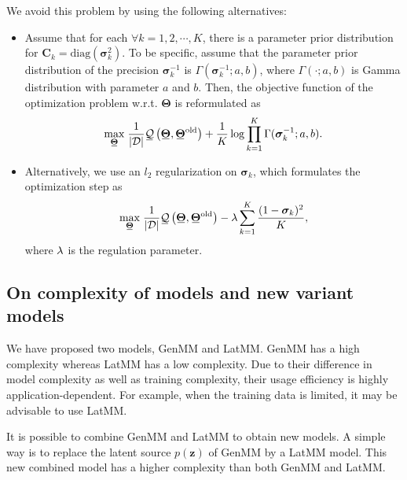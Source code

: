We avoid this problem by using the following alternatives:
\begin{itemize}
\item Assume that for each $\forall k=1, 2, \cdots, K$, there is a parameter prior distribution for $\bm{C}_k=\mathrm{diag}(\bm{\sigma}_k^2)$.
  To be specific, assume that the parameter prior distribution of the precision $\bm{\sigma}_k^{-1}$ is
  $\Gamma(\bm{\sigma}_k^{-1};a, b)$, where $\Gamma(\cdot; a, b)$ is
  Gamma distribution with parameter $a$ and $b$. Then, the objective function of the optimization problem w.r.t. $\bm{\Theta}$ is reformulated as
  \begin{equation}\label{eq-latmm-obj1}
    \umax{ \ubar{\bm{\Theta}}}   \frac{1}{\abs{\Dd}}
    \ubar{\Qq}\left(\ubar{\bm{\Theta}},\ubar{\bm{\Theta}}^{\mathrm{old}} \right)
    +\frac{1}{K}
    \log\prod_{k=1}^K
    \Gamma(\bm{\sigma}_k^{-1};
    a, b).
  \end{equation}
\item Alternatively, we use an $l_2$ regularization on $\bm{\sigma}_k$,
  which formulates the optimization step as
  \begin{equation}
    \umax{\ubar{\bm{\Theta}}}   \frac{1}{\abs{\Dd}} \ubar{\Qq}\left(\ubar{\bm{\Theta}},\ubar{\bm{\Theta}}^{\mathrm{old}}\right)-\lambda \sum_{k=1}^K \frac{(1- \bm{\sigma}_k)^2}{K},
  \end{equation}
  where $\lambda$ is the regulation parameter.
\end{itemize}

\subsection{On complexity of models and new variant models}
We have proposed two models, GenMM and LatMM. GenMM has a high complexity whereas LatMM has a low complexity. Due to their difference in model complexity as well as training complexity, their usage efficiency is highly application-dependent. For example, when the training data is limited, it may be advisable to use LatMM.

It is possible to combine GenMM and LatMM to obtain new models. A simple way is to replace the latent source $p(\bm{z})$ of GenMM by a LatMM model. 
This new combined model has a higher complexity than both GenMM and LatMM. %

